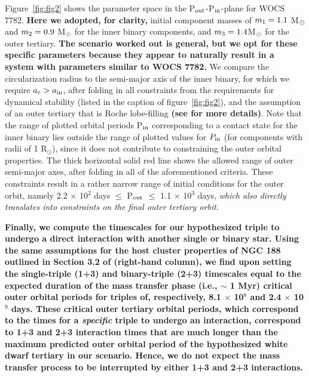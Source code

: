 \documentclass[twocolumn]{aastex62}
\def\simon#1{{\bf {\color{red}[#1 -- Simon]}}}
\begin{document}
Figure~\ref{fig:fig2} shows the parameter space in the P$_{\rm
  out}$-P$_{\rm in}$-plane for WOCS 7782.  \textbf{Here we adopted,
  for clarity,} initial component masses of $m_{\rm 1} = 1.1$ M$_{\rm
  \odot}$ and $m_{\rm 2} = 0.9$ M$_{\rm \odot}$ for the inner binary
components, and $m_{\rm 3} = 1.4 $M$_{\rm \odot}$ for the outer
tertiary.  \textbf{The scenario worked out is general, but we opt for
  these specific parameters because they appear to naturally result in
  a system with parameters similar to WOCS 7782.}  We compare the
circularization radius to the semi-major axis of the inner binary, for
which we require $a_{\rm c} > a_{\rm in}$, after folding in all
constraints from the requirements for dynamical stability (listed in
the caption of figure~\ref{fig:fig2}), and the assumption of an outer
tertiary that is Roche lobe-filling \textbf{(see
  \citet{2014MNRAS.438.1909D} for more details)}.
Note that the range of
plotted orbital periods P$_{\rm in}$ corresponding to a contact state
for the inner binary lies outside the range of plotted values for
$P_{\rm in}$ (for components with radii of 1 R$_{\odot}$),
since it does not contribute to constraining the outer orbital
properties.  The thick horizontal solid red line shows the allowed
range of outer semi-major axes, after folding in all of 
the aforementioned criteria.  These constraints result in a rather narrow
range of initial conditions for the outer orbit, namely 2.2 $\times$
10$^{2}$ days $\le$ P$_{\rm out}$ $\le$ 1.1 $\times$ 10$^3$ days, \textit{which also directly translates into constraints on the final outer tertiary orbit.}

\textbf{Finally, we compute the timescales for our hypothesized triple to undergo a direct interaction with another single or binary star.  Using the same assumptions for the host cluster properties of NGC 188 outlined in Section 3.2 of \citet{2011MNRAS.410.2370L} (right-hand column), we find upon setting the single-triple (1+3) and binary-triple (2+3) timescales equal to the expected duration of the mass transfer phase (i.e., $\sim$ 1 Myr) critical outer orbital periods for triples of, respectively, 8.1 $\times$ 10$^8$ and 2.4 $\times$ 10$^9$ days.  These critical outer tertiary orbital periods, which correspond to the times for a \textit{specific} triple to undergo an interaction, correspond to 1+3 and 2+3 interaction times that are much longer than the maximum predicted outer orbital period of the hypothesized white dwarf tertiary in our scenario.  Hence, we do not expect the mass transfer process to be interrupted by either 1+3 and 2+3 interactions.}
\end{document}
